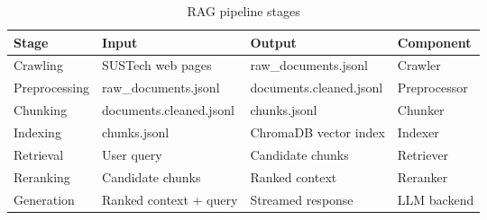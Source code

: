 \begin{table}[h]
\centering
\caption{RAG pipeline stages}
\label{tab:pipeline}
\begin{tabular}{llll}
\hline
\textbf{Stage} & \textbf{Input} & \textbf{Output} & \textbf{Component} \\
\hline
Crawling       & SUSTech web pages          & raw\_documents.jsonl      & Crawler \\
Preprocessing  & raw\_documents.jsonl       & documents.cleaned.jsonl   & Preprocessor \\
Chunking       & documents.cleaned.jsonl    & chunks.jsonl              & Chunker \\
Indexing       & chunks.jsonl               & ChromaDB vector index     & Indexer \\
Retrieval      & User query                 & Candidate chunks          & Retriever \\
Reranking      & Candidate chunks           & Ranked context            & Reranker \\
Generation     & Ranked context + query     & Streamed response         & LLM backend \\
\hline
\end{tabular}
\end{table}
